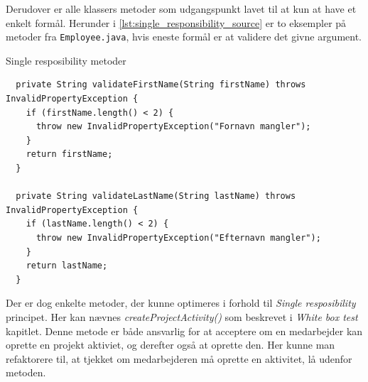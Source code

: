 Derudover er alle klassers metoder som udgangspunkt lavet til at kun at have et enkelt formål. Herunder i \ref{lst:single_responsibility_source} er to eksempler på metoder fra \texttt{Employee.java}, hvis eneste formål er at validere det givne argument.
\begin{listing}[H]
    \centering
    \caption{Single resposibility metoder}\label{lst:single_responsibility_source}
    \begin{verbatim}
  private String validateFirstName(String firstName) throws InvalidPropertyException {
    if (firstName.length() < 2) {
      throw new InvalidPropertyException("Fornavn mangler");
    }
    return firstName;
  }

  private String validateLastName(String lastName) throws InvalidPropertyException {
    if (lastName.length() < 2) {
      throw new InvalidPropertyException("Efternavn mangler");
    }
    return lastName;
  }

    \end{verbatim}
\end{listing}


Der er dog enkelte metoder, der kunne optimeres i forhold til \textit{Single resposibility} principet. Her kan nævnes \textit{createProjectActivity()} som beskrevet i \textit{White box test} kapitlet. Denne metode er både ansvarlig for at acceptere om en medarbejder kan oprette en projekt aktiviet, og derefter også at oprette den. Her kunne man refaktorere til, at tjekket om medarbejderen må oprette en aktivitet, lå udenfor metoden.

